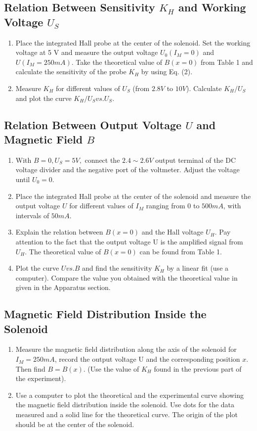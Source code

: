 \documentclass[a4paper,12pt]{article}
\begin{document}
\subsection{Relation Between Sensitivity $ K_H $ and Working Voltage $ U_S $}
\begin{enumerate}
	\item Place the integrated Hall probe at the center of the solenoid. Set the working voltage at 5 V and measure the output voltage $ U_0 (I_M = 0) $ and $ U (I_M = 250 mA) $. Take the theoretical value of $ B(x = 0) $ from Table 1 and calculate the sensitivity of the probe $ K_H $ by using Eq. (2).\
	\item Measure $ K_H $ for different values of $ U_S $ (from $ 2.8 V $ to $ 10 V $). Calculate $ K_H/U_S $ and plot the curve $ K_H/U_S vs. U_S $.
\end{enumerate}
\subsection{Relation Between Output Voltage $ U $ and Magnetic Field $ B $}
\begin{enumerate}
	\item With $ B=0, U_S=5 V, $ connect the $ 2.4 \sim 2.6 V $ output terminal of the DC voltage divider and the negative port of the voltmeter. Adjust the voltage until $ U_0 = 0 $.
	\item Place the integrated Hall probe at the center of the solenoid and measure the output voltage $ U $ for different values of $ I_M $ ranging from 0 to $ 500 mA $, with intervals of $ 50 mA $.
	\item Explain the relation between $ B(x = 0) $ and the Hall voltage $ U_H $. Pay attention to the fact that the output voltage U is the amplified signal from $ U_H $. The theoretical value of $ B(x = 0) $ can be found from Table 1.
	\item Plot the curve $ U vs. B $ and find the sensitivity $ K_H $ by a linear fit (use a computer). Compare the value you obtained with the theoretical value in given in the Apparatus section.
\end{enumerate}
\subsection{Magnetic Field Distribution Inside the Solenoid}
\begin{enumerate}
	\item Measure the magnetic field distribution along the axis of the solenoid for $ I_M = 250 mA $, record the output voltage U and the corresponding position $ x $. Then find $ B = B(x) $. (Use the value of $ K_H $ found in the previous part of the experiment).
	\item Use a computer to plot the theoretical and the experimental curve showing the magnetic field distribution inside the solenoid. Use dots for the data measured and a solid line for the theoretical curve. The origin of the plot should be at the center of the solenoid.
\end{enumerate}
\end{document}
